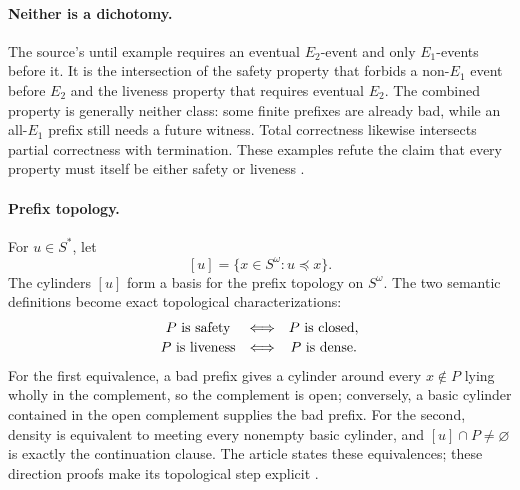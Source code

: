 \paragraph{Neither is a dichotomy.}
The source's until example requires an eventual \(E_2\)-event and only
\(E_1\)-events before it.  It is the intersection of the safety property that
forbids a non-\(E_1\) event before \(E_2\) and the liveness property that
requires eventual \(E_2\).  The combined property is generally neither class:
some finite prefixes are already bad, while an all-\(E_1\) prefix still needs
a future witness.  Total correctness likewise intersects partial correctness
with termination.  These examples refute the claim that every property must
itself be either safety or liveness \cite[pp.~183--184]{AlpernSchneider1985}.

\paragraph{Prefix topology.}
For \(u\in S^*\), let
\[
 [u]=\{x\in S^\omega:u\preceq x\}.
\]
The cylinders \([u]\) form a basis for the prefix topology on \(S^\omega\).
The two semantic definitions become exact topological characterizations:
\[
 \begin{array}{c@{\quad\Longleftrightarrow\quad}c}
 P\text{ is safety}&P\text{ is closed},\\[2pt]
 P\text{ is liveness}&P\text{ is dense}.
 \end{array}
\]
For the first equivalence, a bad prefix gives a cylinder around every
\(x\notin P\) lying wholly in the complement, so the complement is open;
conversely, a basic cylinder contained in the open complement supplies the bad
prefix.  For the second, density is equivalent to meeting every nonempty basic
cylinder, and \([u]\cap P\neq\varnothing\) is exactly the continuation clause.
The article states these equivalences; these direction proofs make its
topological step explicit \cite[p.~184]{AlpernSchneider1985}.

